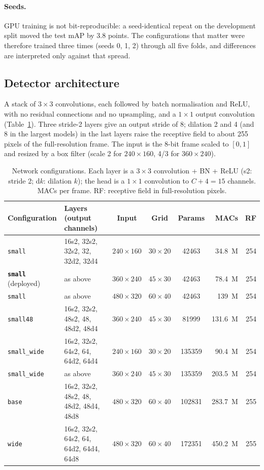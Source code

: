\documentclass[11pt,a4paper]{article}
\newcommand{\cfg}[1]{\texttt{#1}}
\begin{document}
\paragraph{Seeds.} GPU training is not bit-reproducible: a seed-identical
repeat on the development split moved the test mAP by 3.8 points. The
configurations that matter were therefore trained three times (seeds 0, 1,
2) through all five folds, and differences are interpreted only against
that spread.

\subsection{Detector architecture}
\label{sec:arch}

A stack of $3 \times 3$ convolutions, each followed by batch normalisation
and ReLU, with no residual connections and no upsampling, and a
$1 \times 1$ output convolution (Table~\ref{tab:configs}). Three stride-2
layers give an output stride of 8; dilation 2 and 4 (and 8 in the largest
models) in the last layers raise the receptive field to about 255 pixels of
the full-resolution frame. The input is the 8-bit frame scaled to $[0, 1]$
and resized by a box filter (scale 2 for $240 \times 160$, 4/3 for
$360 \times 240$).

\begin{table}[H]
  \centering
  \small
  \setlength{\tabcolsep}{4pt}
  \caption{Network configurations. Each layer is a $3{\times}3$
  convolution + BN + ReLU (s2: stride 2; d$k$: dilation $k$); the head is a
  $1 \times 1$ convolution to $C + 4 = 15$ channels. MACs per frame. RF:
  receptive field in full-resolution pixels.}
  \label{tab:configs}
  \begin{tabular}{llcccrr}
    \toprule
    Configuration & Layers (output channels) & Input & Grid & Params & MACs & RF \\
    \midrule
    \cfg{small} & 16s2, 32s2, 32s2, 32, 32d2, 32d4 & $240{\times}160$ & $30{\times}20$ & \num{42463} & \SI{34.8}{M} & 254 \\
    \textbf{\cfg{small}} (deployed) & as above & $360{\times}240$ & $45{\times}30$ & \num{42463} & \SI{78.4}{M} & 254 \\
    \cfg{small} & as above & $480{\times}320$ & $60{\times}40$ & \num{42463} & \SI{139}{M} & 254 \\
    \cfg{small48} & 16s2, 32s2, 48s2, 48, 48d2, 48d4 & $360{\times}240$ & $45{\times}30$ & \num{81999} & \SI{131.6}{M} & 254 \\
    \cfg{small\_wide} & 16s2, 32s2, 64s2, 64, 64d2, 64d4 & $240{\times}160$ & $30{\times}20$ & \num{135359} & \SI{90.4}{M} & 254 \\
    \cfg{small\_wide} & as above & $360{\times}240$ & $45{\times}30$ & \num{135359} & \SI{203.5}{M} & 254 \\
    \cfg{base} & 16s2, 32s2, 48s2, 48, 48d2, 48d4, 48d8 & $480{\times}320$ & $60{\times}40$ & \num{102831} & \SI{283.7}{M} & 255 \\
    \cfg{wide} & 16s2, 32s2, 64s2, 64, 64d2, 64d4, 64d8 & $480{\times}320$ & $60{\times}40$ & \num{172351} & \SI{450.2}{M} & 255 \\
    \bottomrule
  \end{tabular}
\end{table}
\end{document}
